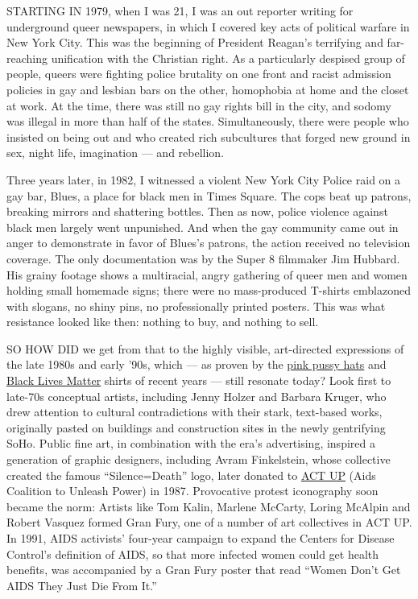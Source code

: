STARTING IN 1979, when I was 21, I was an out reporter writing for
underground queer newspapers, in which I covered key acts of political
warfare in New York City. This was the beginning of President Reagan's
terrifying and far-reaching unification with the Christian right. As a
particularly despised group of people, queers were fighting police
brutality on one front and racist admission policies in gay and lesbian
bars on the other, homophobia at home and the closet at work. At the
time, there was still no gay rights bill in the city, and sodomy was
illegal in more than half of the states. Simultaneously, there were
people who insisted on being out and who created rich subcultures that
forged new ground in sex, night life, imagination --- and rebellion.

Three years later, in 1982, I witnessed a violent New York City Police
raid on a gay bar, Blues, a place for black men in Times Square. The
cops beat up patrons, breaking mirrors and shattering bottles. Then as
now, police violence against black men largely went unpunished. And when
the gay community came out in anger to demonstrate in favor of Blues's
patrons, the action received no television coverage. The only
documentation was by the Super 8 filmmaker Jim Hubbard. His grainy
footage shows a multiracial, angry gathering of queer men and women
holding small homemade signs; there were no mass-produced T-shirts
emblazoned with slogans, no shiny pins, no professionally printed
posters. This was what resistance looked like then: nothing to buy, and
nothing to sell.

SO HOW DID we get from that to the highly visible, art-directed
expressions of the late 1980s and early '90s, which --- as proven by the
\href{https://www.nytimes.com/2017/12/13/fashion/the-year-in-stuff.html}{pink
pussy hats} and
\href{https://www.nytimes.com/2016/08/23/us/how-blacklivesmatter-came-to-define-a-movement.html}{Black
Lives Matter} shirts of recent years --- still resonate today? Look
first to late-70s conceptual artists, including Jenny Holzer and Barbara
Kruger, who drew attention to cultural contradictions with their stark,
text-based works, originally pasted on buildings and construction sites
in the newly gentrifying SoHo. Public fine art, in combination with the
era's advertising, inspired a generation of graphic designers, including
Avram Finkelstein, whose collective created the famous ``Silence=Death''
logo, later donated to \href{http://www.actupny.org/}{ACT UP} (Aids
Coalition to Unleash Power) in 1987. Provocative protest iconography
soon became the norm: Artists like Tom Kalin, Marlene McCarty, Loring
McAlpin and Robert Vasquez formed Gran Fury, one of a number of art
collectives in ACT UP. In 1991, AIDS activists' four-year campaign to
expand the Centers for Disease Control's definition of AIDS, so that
more infected women could get health benefits, was accompanied by a Gran
Fury poster that read ``Women Don't Get AIDS They Just Die From It.''

